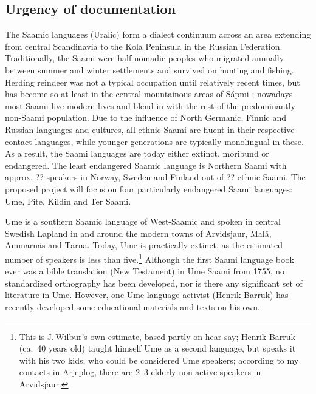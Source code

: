 \documentclass[a4paper,12pt]{article}
\begin{document}
\subsection{Urgency of documentation}
The Saamic languages (Uralic) form a dialect continuum across an area extending from central Scandinavia to the Kola Peninsula in the Russian Federation. Traditionally, the Saami were half-nomadic peoples who migrated annually between summer and winter settlements and survived on hunting and fishing. Herding reindeer was not a typical occupation until relatively recent times, but has become so at least in the central mountainous areas of Sápmi %
; nowadays most Saami live modern lives and blend in with the rest of the predominantly non-Saami population. Due to the influence of North Germanic, Finnic and Russian languages and cultures, all ethnic Saami are fluent in their respective contact languages, while younger generations are typically monolingual in these. As a result, the Saami languages are today either extinct, moribund or endangered. The least endangered Saamic language is Northern Saami with approx. ?? speakers in Norway, Sweden and Finland out of ?? ethnic Saami.%
The proposed project will focus on four particularly endangered Saami languages: Ume, Pite, Kildin and Ter Saami.

Ume is a southern Saamic language of West-Saamic and spoken in central Swedish Lapland in and around the modern towns of Arvidsjaur, Malå, Ammarnäs and Tärna. Today, Ume is practically extinct, as the estimated number of speakers is less than five.\footnote{This is J.\,Wilbur's own estimate, based partly on hear-say; Henrik Barruk (ca.~40 years old) taught himself Ume as a second language, but speaks it with his two kids, who could be considered Ume speakers; according to my contacts in Arjeplog, there are 2–3 elderly non-active speakers in Arvidsjaur.} Although the first Saami language book ever was a bible translation (New Testament) in Ume Saami from 1755, no standardized orthography has been developed, nor is there any significant set of literature in Ume. However, one Ume language activist (Henrik Barruk) has recently developed some educational materials and texts on his own.
\end{document}
